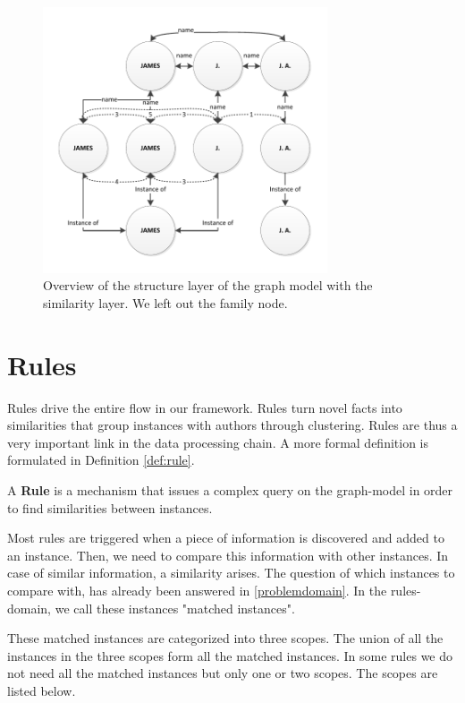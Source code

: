 \begin{figure}[htb]
	\centering
		\includegraphics[width=0.75\textwidth]{fig/graphstructureoverviewsim}
	\caption{Overview of the structure layer of the graph model with the similarity layer. We left out the family node.}
	\label{fig:graphstructureoverviewsim}
\end{figure}

\section{Rules}
\label{rules}

Rules drive the entire flow in our framework. Rules turn novel facts into similarities that group instances with authors through clustering. Rules are thus a very important link in the data processing chain. A more formal definition is formulated in Definition \autoref{def:rule}.

\begin{mydef}
\label{def:rule}
A \textbf{Rule} is a mechanism that issues a complex query on the graph-model in order to find similarities between instances.
\end{mydef}

Most rules are triggered when a piece of information is discovered and added to an instance. Then, we need to compare this information with other instances. In case of similar information, a similarity arises. The question of which instances to compare with, has already been answered in \autoref{problemdomain}. In the rules-domain, we call these instances "matched instances".

These matched instances are categorized into three scopes. The union of all the instances in the three scopes form all the matched instances. In some rules we do not need all the matched instances but only one or two scopes. The scopes are listed below.

